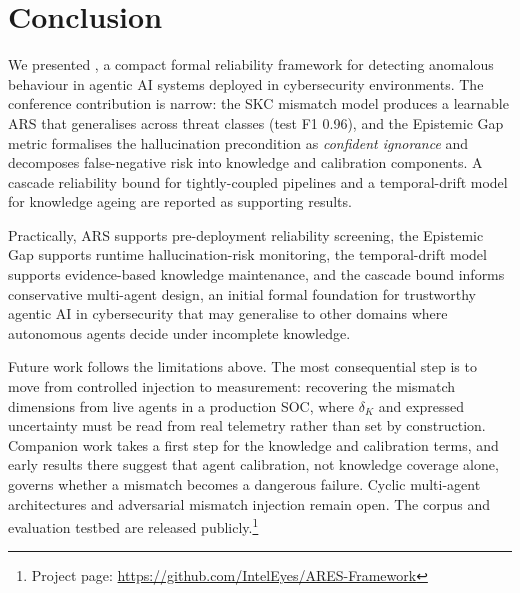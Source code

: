 \section{Conclusion}
\label{sec:conclusion}

We presented \ARES{}, a compact formal reliability framework for
detecting anomalous behaviour in agentic AI systems deployed in
cybersecurity environments. The conference contribution is narrow:
the SKC mismatch model produces a learnable ARS that generalises
across threat classes (test F1 0.96), and the Epistemic Gap
metric formalises the hallucination precondition as
\textit{confident ignorance} and decomposes false-negative risk into
knowledge and calibration components. A cascade reliability bound for
tightly-coupled pipelines and a temporal-drift model for knowledge
ageing are reported as supporting results.

Practically, ARS supports pre-deployment reliability screening, the
Epistemic Gap supports runtime hallucination-risk monitoring, the
temporal-drift model supports evidence-based knowledge maintenance, and
the cascade bound informs conservative multi-agent design, an initial
formal foundation for trustworthy agentic AI in cybersecurity that may
generalise to other domains where autonomous agents decide under
incomplete knowledge.

Future work follows the limitations above. The most consequential step
is to move from controlled injection to measurement: recovering the
mismatch dimensions from live agents in a production SOC, where
$\delta_K$ and expressed uncertainty must be read from real telemetry
rather than set by construction. Companion work takes a first step for
the knowledge and calibration terms, and early results there suggest
that agent calibration, not knowledge coverage alone, governs whether a
mismatch becomes a dangerous failure. Cyclic multi-agent architectures
and adversarial mismatch injection remain open. The \SAFK{} corpus and
evaluation testbed are released
publicly.\footnote{Project page: \url{https://github.com/IntelEyes/ARES-Framework}}
